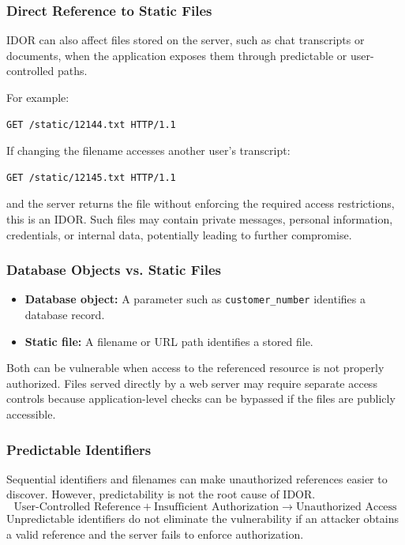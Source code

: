 \documentclass[11pt,a4paper]{article}
\begin{document}
\subsubsection{Direct Reference to Static Files}

IDOR can also affect files stored on the server, such as chat transcripts or documents, when the application exposes them through predictable or user-controlled paths.

For example:
\begin{lstlisting}[language=HTTP]
GET /static/12144.txt HTTP/1.1
\end{lstlisting}

If changing the filename accesses another user's transcript:
\begin{lstlisting}[language=HTTP]
GET /static/12145.txt HTTP/1.1
\end{lstlisting}

and the server returns the file without enforcing the required access restrictions, this is an IDOR.
Such files may contain private messages, personal information, credentials, or internal data, potentially leading to further compromise.

\subsubsection{Database Objects vs. Static Files}

\begin{itemize}
    \item \textbf{Database object:} A parameter such as \texttt{customer\_number} identifies a database record.
    \item \textbf{Static file:} A filename or URL path identifies a stored file.
\end{itemize}

Both can be vulnerable when access to the referenced resource is not properly authorized. Files served directly by a web server may require separate access controls because application-level checks can be bypassed if the files are publicly accessible.

\subsubsection{Predictable Identifiers}

Sequential identifiers and filenames can make unauthorized references easier to discover. However, predictability is not the root cause of IDOR.
\[
    \text{User-Controlled Reference}
    +
    \text{Insufficient Authorization}
    \rightarrow
    \text{Unauthorized Access}
\]
Unpredictable identifiers do not eliminate the vulnerability if an attacker obtains a valid reference and the server fails to enforce authorization.
\end{document}
